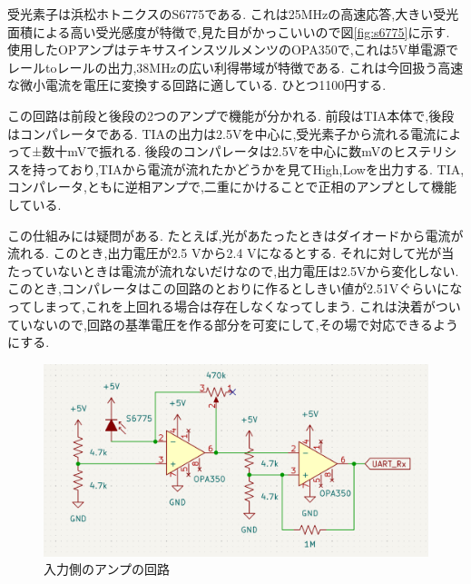 \documentclass[a4paper,10pt]{article}
\begin{document}
\begin{multicols}{2}
受光素子は浜松ホトニクスのS6775である.
これは25MHzの高速応答,大きい受光面積による高い受光感度が特徴で,見た目がかっこいいので図\ref{fig:s6775}に示す.
使用したOPアンプはテキサスインスツルメンツのOPA350で,これは5V単電源でレールtoレールの出力,38MHzの広い利得帯域が特徴である.
これは今回扱う高速な微小電流を電圧に変換する回路に適している.
ひとつ1100円する.

この回路は前段と後段の2つのアンプで機能が分かれる.
前段はTIA本体で,後段はコンパレータである.
TIAの出力は2.5Vを中心に,受光素子から流れる電流によって±数十mVで振れる.
後段のコンパレータは2.5Vを中心に数mVのヒステリシスを持っており,TIAから電流が流れたかどうかを見てHigh,Lowを出力する.
TIA,コンパレータ,ともに逆相アンプで,二重にかけることで正相のアンプとして機能している.

この仕組みには疑問がある.
たとえば,光があたったときはダイオードから電流が流れる.
このとき,出力電圧が2.5 Vから2.4 Vになるとする.
それに対して光が当たっていないときは電流が流れないだけなので,出力電圧は2.5Vから変化しない.
このとき,コンパレータはこの回路のとおりに作るとしきい値が2.51Vぐらいになってしまって,これを上回れる場合は存在しなくなってしまう.
これは決着がついていないので,回路の基準電圧を作る部分を可変にして,その場で対応できるようにする.

\begin{figure}[H]
    \centering
    \includegraphics[width=1.4\linewidth,angle=270]{figure/tia.png} 
    \caption{入力側のアンプの回路} 
    \label{fig:tia}
\end{figure}


\end{multicols}
\end{document}

